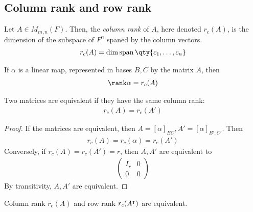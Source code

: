     \subsection{Column rank and row rank}
    \begin{definition}
        Let $A \in M_{m,n}(F)$.
        Then, the \textit{column rank} of $A$, here denoted $r_c(A)$, is the dimension of the subspace of $F^n$ spaned by the column vectors.
        \begin{align*}
            r_c(A) = \dim \vecspan \qty{c_1, \dots, c_n}
        \end{align*}
    \end{definition}
    \begin{remark}
        If $\alpha$ is a linear map, represented in bases $B, C$ by the matrix $A$, then
        \begin{align*}
            \rank \alpha = r_c(A)
        \end{align*}
    \end{remark}
    \begin{proposition}
        Two matrices are equivalent if they have the same column rank:
        \begin{align*}
            r_c(A) = r_c(A')
        \end{align*}
    \end{proposition}
    \begin{proof}
        If the matrices are equivalent, then $A = [\alpha]_{BC}, A' = [\alpha]_{B',C'}$.
        Then
        \begin{align*}
            r_c(A) = r_c(\alpha) = r_c(A')
        \end{align*}
        Conversely, if $r_c(A) = r_c(A') = r$, then $A, A'$ are equivalent to
        \begin{align*}
            \begin{pmatrix}
                I_r & 0 \\
                0   & 0
            \end{pmatrix}
        \end{align*}
        By transitivity, $A, A'$ are equivalent.
    \end{proof}
    \begin{theorem}
        Column rank $r_c(A)$ and row rank $r_c(A^\intercal)$ are equivalent.
    \end{theorem}

